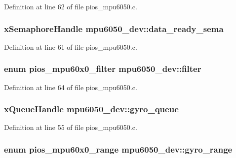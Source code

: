 \-Definition at line 62 of file pios\-\_\-mpu6050.\-c.

\hypertarget{structmpu6050__dev_ad4d0a233a1d6f73d37c88f646dd36e3f}{
\subsubsection[{data\-\_\-ready\-\_\-sema}]{\setlength{\rightskip}{0pt plus 5cm}x\-Semaphore\-Handle {\bf mpu6050\-\_\-dev\-::data\-\_\-ready\-\_\-sema}}}\label{structmpu6050__dev_ad4d0a233a1d6f73d37c88f646dd36e3f}


\-Definition at line 61 of file pios\-\_\-mpu6050.\-c.

\hypertarget{structmpu6050__dev_ac959727d047bc26d53673d376f76f8bc}{
\subsubsection[{filter}]{\setlength{\rightskip}{0pt plus 5cm}enum {\bf pios\-\_\-mpu60x0\-\_\-filter} {\bf mpu6050\-\_\-dev\-::filter}}}\label{structmpu6050__dev_ac959727d047bc26d53673d376f76f8bc}


\-Definition at line 64 of file pios\-\_\-mpu6050.\-c.

\hypertarget{structmpu6050__dev_a91859d6141bf6c0d8dc50d144339baab}{
\subsubsection[{gyro\-\_\-queue}]{\setlength{\rightskip}{0pt plus 5cm}x\-Queue\-Handle {\bf mpu6050\-\_\-dev\-::gyro\-\_\-queue}}}\label{structmpu6050__dev_a91859d6141bf6c0d8dc50d144339baab}


\-Definition at line 55 of file pios\-\_\-mpu6050.\-c.

\hypertarget{structmpu6050__dev_aaf65682756b6135dbeb042934660076a}{
\subsubsection[{gyro\-\_\-range}]{\setlength{\rightskip}{0pt plus 5cm}enum {\bf pios\-\_\-mpu60x0\-\_\-range} {\bf mpu6050\-\_\-dev\-::gyro\-\_\-range}}}\label{structmpu6050__dev_aaf65682756b6135dbeb042934660076a}


